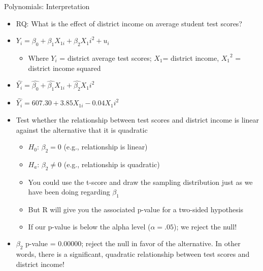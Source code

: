 \documentclass[8pt,ignorenonframetext,dvipsnames]{beamer}
\providecommand{\tightlist}{%
  \setlength{\itemsep}{0pt}\setlength{\parskip}{0pt}}
\let\olditem\item
\renewcommand{\item}{%
  \olditem\vspace{4pt}
}
\begin{document}
\begin{frame}{Polynomials: Interpretation}
\protect\hypertarget{polynomials-interpretation}{}

\begin{itemize}
\tightlist
\item
  RQ: What is the effect of district income on average student test
  scores?
\item
  \(Y_i = \beta_0 + \beta_1X_{1i} + \beta_2{X_1i}^2 + u_i\)

  \begin{itemize}
  \tightlist
  \item
    Where \(Y_i\) = district average test scores; \(X_1\)= district
    income, \({X_1}^2\) = district income squared
  \end{itemize}
\item
  \(\hat{Y_i} = \hat{\beta_0} + \hat{\beta_1}X_{1i} + \hat{\beta_2}{X_1i}^2\)
\item
  \(\hat{Y_i} = 607.30 + 3.85X_{1i} - 0.04{X_1i}^2\)
\item
  Test whether the relationship between test scores and district income
  is linear against the alternative that it is quadratic

  \begin{itemize}
  \tightlist
  \item
    \(H_0\): \(\beta_2 = 0\) (e.g., relationship is linear)
  \item
    \(H_a\): \(\beta_2 \ne 0\) (e.g., relationship is quadratic)
  \item
    You could use the t-score and draw the sampling distribution just as
    we have been doing regarding \(\beta_1\)
  \item
    But R will give you the associated p-value for a two-sided
    hypothesis
  \item
    If our p-value is below the alpha level (\(\alpha= .05\)); we reject
    the null!
  \end{itemize}
\item
  \(\beta_2\) p-value = 0.00000; reject the null in favor of the
  alternative. In other words, there is a significant, quadratic
  relationship between test scores and district income!
\end{itemize}

\end{frame}
\end{document}
